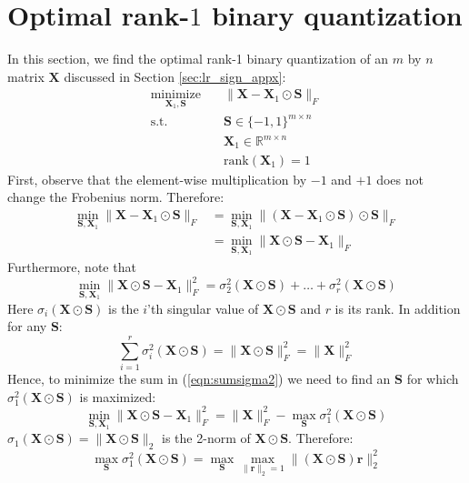 \documentclass[10pt,twocolumn,letterpaper]{article}
\def\vr{{\bm{r}}}
\def\mX{{\bm{X}}}
\def\mS{{\bm{S}}}
\newcommand{\R}{\mathbb{R}}
\begin{document}
\section{Optimal rank-$1$ binary quantization} \label{sec:opt_rank1}
In this section, we find the optimal rank-1 binary quantization of an $m$ by $n$ matrix $\mX$ discussed in Section \ref{sec:lr_sign_appx}:
\begin{equation}\label{eqn:2bits_opt_problem}
\begin{aligned}
\underset{\mX_1, \mS}{\text{minimize}} \quad &
\| \mX - \mX_1 \odot \mS \|_F\\
\text{s.t.} \quad & \mS \in \{-1,1\}^{m \times n}\\
\quad & \mX_1 \in \R^{m \times n}\\
\quad & \text{rank}(\mX_1) = 1
\end{aligned}
\end{equation}
First, observe that the element-wise multiplication by $-1$ and $+1$ does not change the Frobenius norm. Therefore:
\begin{equation}
\label{eqn:rank1opt}
\begin{aligned}
\min_{\mS, \mX_1} \| \mX - \mX_1 \odot \mS \|_F &= \min_{\mS, \mX_1}  \| (\mX - \mX_1 \odot \mS)\odot \mS \|_F\\ &= \min_{\mS, \mX_1}  \| \mX \odot \mS- \mX_1 \|_F
\end{aligned}
\end{equation}
Furthermore, note that 
\begin{equation}\label{eqn:sumsigma2}
\min_{\mS, \mX_1}  \| \mX \odot \mS- \mX_1 \|_F^2 = \sigma_2^2 (\mX \odot \mS) + \ldots + \sigma_r^2 (\mX \odot \mS)
\end{equation}
Here $\sigma_i (\mX \odot \mS)$ is the $i$'th singular value of $\mX \odot \mS$ and $r$ is its rank. In addition for any $\mS$:
\begin{equation}
\sum_{i=1}^r \sigma_i^2(\mX \odot \mS) = \|\mX \odot \mS\|_F^2 = \| \mX \|_F^2
\end{equation}
Hence, to minimize the sum in (\ref{eqn:sumsigma2}) we need to find an $\mS$ for which $\sigma_1^2(\mX \odot \mS)$ is maximized:
\begin{equation}
\min_{\mS, \mX_1}  \| \mX \odot \mS- \mX_1 \|_F^2 = \|\mX\|_F^2 - \max_{\mS}  \sigma_1^2(\mX \odot \mS)
\end{equation}
$\sigma_1(\mX \odot \mS) =  \| \mX \odot \mS \|_2$ is the 2-norm of $\mX \odot \mS$. Therefore:
\begin{equation}
\max_{\mS}  \sigma_1^2(\mX \odot \mS) = \max_{\mS} \max_{\|\vr\|_2=1}  \| (\mX \odot \mS)\vr \|_2^2
\end{equation}
\end{document}
